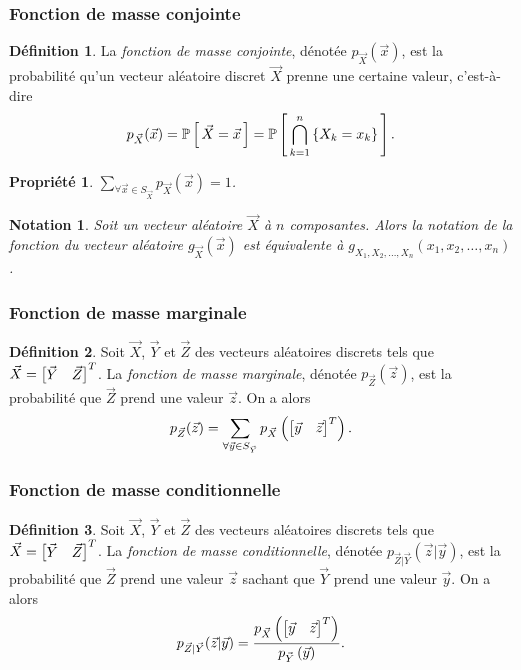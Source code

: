 \documentclass[11pt]{article}
\makeatletter
\renewcommand\P[1]{%
	\ensuremath{%
		\mathbb{P}\left[\,#1\,\right]%
	}%
}%
\newcommand\invec[1]{%
	\ensuremath{%
		\left[%
			\begin{matrix}%
				#1%
			\end{matrix}%
		\right]^T%
	}%
}%
\newtheorem*{notation}{Notation}
\newtheorem{property}{Propriété}
\theoremstyle{remark}
\theoremstyle{definition}
\newtheorem*{@definition}{Définition}
\newenvironment{definition}{%
	\begin{@definition}%
}{%
	\end{@definition}%
	\setcounter{property}{0}%
}
\makeatother
\begin{document}
\subsubsection{Fonction de masse conjointe}
\begin{definition}
	La \textit{fonction de masse conjointe}, dénotée $p_{\vec{X}}(\vec{x})$,
	est la probabilité qu'un vecteur aléatoire discret $\vec{X}$ prenne une
	certaine valeur, c'est-à-dire
	\begin{equation*}
		p_{\vec{X}}(\vec{x})
		=\P{\vec{X}=\vec{x}}
		=\P{\bigcap_{k=1}^n\left\{X_k=x_k\right\}}.
	\end{equation*}
\end{definition}

\begin{property}
	$\displaystyle\sum_{\forall\vec{x}\in S_{\vec{X}}}p_{\vec{X}}(\vec{x})=1$.
\end{property}

\begin{notation}
	Soit un vecteur aléatoire $\vec{X}$ à $n$ composantes. Alors la notation de
	la fonction du vecteur aléatoire $g_{\vec{X}}(\vec{x})$ est équivalente à
	$g_{X_1,X_2,\dots,X_n}(x_1,x_2,\dots,x_n)$.
\end{notation}

\subsubsection{Fonction de masse marginale}
\begin{definition}
	Soit $\vec{X}$, $\vec{Y}$ et $\vec{Z}$ des vecteurs aléatoires discrets
	tels que $\vec{X}=\invec{\vec{Y}&\vec{Z}}$. La \textit{fonction de masse
	marginale}, dénotée $p_{\vec{Z}}(\vec{z})$, est la probabilité que
	$\vec{Z}$ prend une valeur $\vec{z}$. On a alors
	\begin{equation*}
		p_{\vec{Z}}(\vec{z})
		=\sum_{\forall\vec{y}\in S_{\vec{Y}}}
			p_{\vec{X}}\left(\invec{\vec{y}&\vec{z}}\right).
	\end{equation*}
\end{definition}

\subsubsection{Fonction de masse conditionnelle}
\begin{definition}
	Soit $\vec{X}$, $\vec{Y}$ et $\vec{Z}$ des vecteurs aléatoires discrets 
	tels que $\vec{X}=\invec{\vec{Y}&\vec{Z}}$. La \textit{fonction de masse
	conditionnelle}, dénotée $p_{\vec{Z}|\vec{Y}}(\vec{z}|\vec{y})$, est la
	probabilité que $\vec{Z}$ prend une valeur $\vec{z}$ sachant que $\vec{Y}$
	prend une valeur $\vec{y}$. On a alors
	\begin{equation*}
		p_{\vec{Z}|\vec{Y}}(\vec{z}|\vec{y})
		=\frac{p_{\vec{X}}\left(\invec{\vec{y}&\vec{z}}\right)}
			{p_{\vec{Y}}\left(\vec{y}\right)}.
	\end{equation*}
\end{definition}
\end{document}
